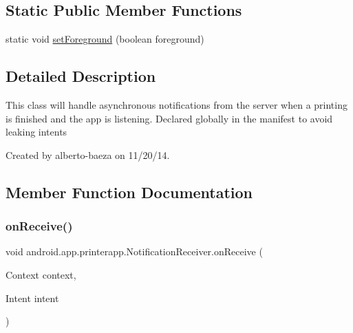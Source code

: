 \subsection*{Static Public Member Functions}
\begin{DoxyCompactItemize}
\item 
static void \hyperlink{classandroid_1_1app_1_1printerapp_1_1_notification_receiver_a1af3ef3fb06d82e9cb896bda7faa8690}{set\+Foreground} (boolean foreground)
\end{DoxyCompactItemize}


\subsection{Detailed Description}
This class will handle asynchronous notifications from the server when a printing is finished and the app is listening. Declared globally in the manifest to avoid leaking intents

Created by alberto-\/baeza on 11/20/14. 

\subsection{Member Function Documentation}
\mbox{\label{classandroid_1_1app_1_1printerapp_1_1_notification_receiver_acaa678788162ce1dd9094ae402c435da}} 
\subsubsection{\texorpdfstring{on\+Receive()}{onReceive()}}
{\footnotesize\ttfamily void android.\+app.\+printerapp.\+Notification\+Receiver.\+on\+Receive (\begin{DoxyParamCaption}\item[{Context}]{context,  }\item[{Intent}]{intent }\end{DoxyParamCaption})}

\mbox{\label{classandroid_1_1app_1_1printerapp_1_1_notification_receiver_a1af3ef3fb06d82e9cb896bda7faa8690}} 
